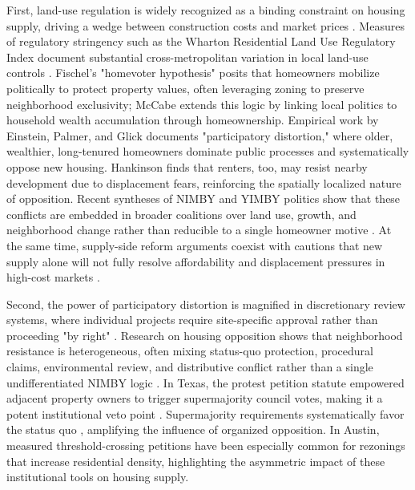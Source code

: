 \documentclass[11pt, letterpaper]{article}
\begin{document}
First, land-use regulation is widely recognized as a binding constraint on housing supply, driving a wedge between construction costs and market prices \cite{glaeser2005manhattan, glaeser2003zoning, gyourko2015regulation,quigley2005effects}. Measures of regulatory stringency such as the Wharton Residential Land Use Regulatory Index document substantial cross-metropolitan variation in local land-use controls \cite{gyourko2008wrluri,gyourko2021local}. Fischel's "homevoter hypothesis" \cite{fischel2001homevoter} posits that homeowners mobilize politically to protect property values, often leveraging zoning to preserve neighborhood exclusivity; McCabe \cite{mccabe2016} extends this logic by linking local politics to household wealth accumulation through homeownership. Empirical work by Einstein, Palmer, and Glick \cite{einstein2019book} documents "participatory distortion," where older, wealthier, long-tenured homeowners dominate public processes and systematically oppose new housing. Hankinson \cite{hankinson2018} finds that renters, too, may resist nearby development due to displacement fears, reinforcing the spatially localized nature of opposition. Recent syntheses of NIMBY and YIMBY politics show that these conflicts are embedded in broader coalitions over land use, growth, and neighborhood change rather than reducible to a single homeowner motive \cite{brouwer2024nimbys}. At the same time, supply-side reform arguments coexist with cautions that new supply alone will not fully resolve affordability and displacement pressures in high-cost markets \cite{hamilton2023reform,been2019supply}.

Second, the power of participatory distortion is magnified in discretionary review systems, where individual projects require site-specific approval rather than proceeding "by right" \cite{manville2016unpermitted, hills2011zoning}. Research on housing opposition shows that neighborhood resistance is heterogeneous, often mixing status-quo protection, procedural claims, environmental review, and distributive conflict rather than a single undifferentiated NIMBY logic \cite{pendall1999opposition,schively2007nimby}. In Texas, the protest petition statute empowered adjacent property owners to trigger supermajority council votes, making it a potent institutional veto point \cite{texas211006,furth2023invisible}. Supermajority requirements systematically favor the status quo \cite{cellini2010schools}, amplifying the influence of organized opposition. In Austin, measured threshold-crossing petitions have been especially common for rezonings that increase residential density, highlighting the asymmetric impact of these institutional tools on housing supply.
\end{document}

